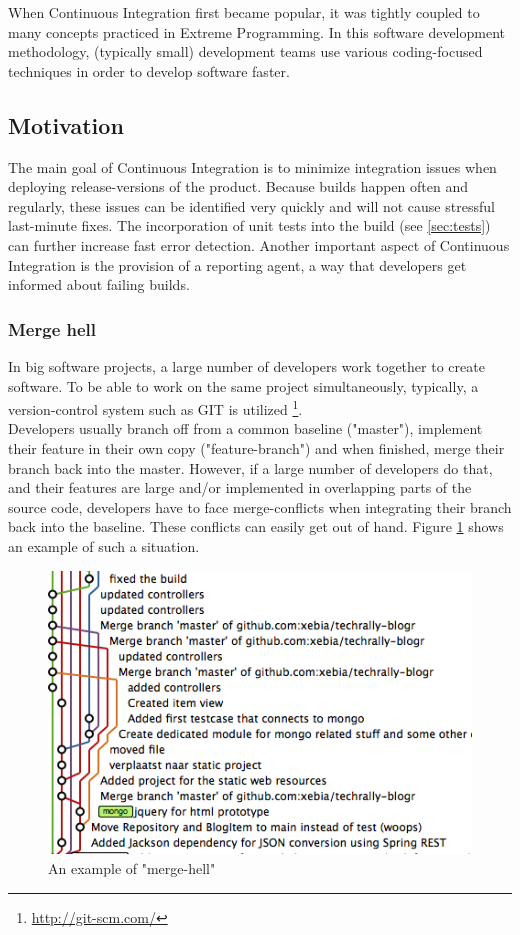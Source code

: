 When Continuous Integration first became popular, it was tightly coupled to many
concepts practiced in Extreme Programming. In this software development
methodology, (typically small) development teams use various coding-focused
techniques in order to develop software faster.

\subsection{Motivation}\label{sec:motivation}

The main goal of Continuous Integration is to minimize integration issues when
deploying release-versions of the product. Because builds happen often and
regularly, these issues can be identified very quickly and will not cause
stressful last-minute fixes. The incorporation of unit tests into the
build (see \ref{sec:tests}) can further increase fast error detection. Another
important aspect of Continuous Integration is the provision of a reporting
agent, a way that developers get informed about failing builds.

\subsubsection{Merge hell}\label{sec:merge-hell}

In big software projects, a large number of developers work together to create
software. To be able to work on the same project simultaneously, typically, a
version-control system such as GIT is utilized
\footnote{\url{http://git-scm.com/}}.\\

Developers usually branch off from a common baseline ("master"), implement their
feature in their own copy ("feature-branch") and when finished, merge their
branch back into the master. However, if a large number of developers do that,
and their features are large and/or implemented in overlapping parts of the
source code, developers have to face merge-conflicts when integrating their
branch back into the baseline. These conflicts can easily get out of hand.
Figure \ref{fig:merge-hell} shows an example of such a situation.

\begin{figure}[h]
    \centering
    \includegraphics[width=0.6\linewidth]{images/merge-hell.png}
    \caption{An example of "merge-hell" \cite{mooij:2010}}
    \label{fig:merge-hell}
\end{figure}

